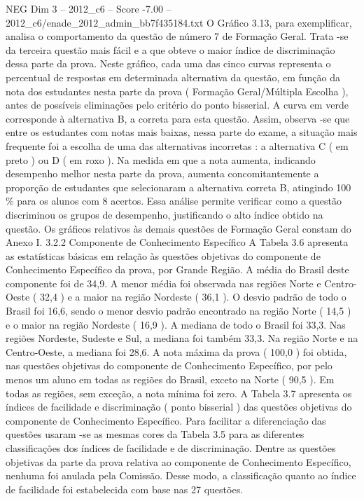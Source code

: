 \begin{textsample}{NEG Dim 3 – 2012\_c6 – Score -7.00 – 2012\_c6/enade\_2012\_admin\_bb7f435184.txt}
O Gráfico 3.13, para exemplificar, analisa o comportamento da questão de número 7 de Formação Geral.
Trata -se da terceira questão mais fácil e a que obteve o maior índice de discriminação dessa parte da prova.
Neste gráfico, cada uma das cinco curvas representa o percentual de respostas em determinada alternativa da questão, em função da nota dos estudantes nesta parte da prova ( Formação Geral/Múltipla Escolha ), antes de possíveis eliminações pelo critério do ponto bisserial.
A curva em verde corresponde à alternativa B, a correta para esta questão.
Assim, observa -se que entre os estudantes com notas mais baixas, nessa parte do exame, a situação mais frequente foi a escolha de uma das alternativas incorretas : a alternativa C ( em preto ) ou D ( em roxo ).
Na medida em que a nota aumenta, indicando desempenho melhor nesta parte da prova, aumenta concomitantemente a proporção de estudantes que selecionaram a alternativa correta B, atingindo 100 \% para os alunos com 8 acertos.
Essa análise permite verificar como a questão discriminou os grupos de desempenho, justificando o alto índice obtido na questão.
Os gráficos relativos às demais questões de Formação Geral constam do Anexo I. 3.2.2 Componente de Conhecimento Específico A Tabela 3.6 apresenta as estatísticas básicas em relação às questões objetivas do componente de Conhecimento Específico da prova, por Grande Região.
A média do Brasil deste componente foi de 34,9.
A menor média foi observada nas regiões Norte e Centro-Oeste ( 32,4 ) e a maior na região Nordeste ( 36,1 ).
O desvio padrão de todo o Brasil foi 16,6, sendo o menor desvio padrão encontrado na região Norte ( 14,5 ) e o maior na região Nordeste ( 16,9 ).
A mediana de todo o Brasil foi 33,3.
Nas regiões Nordeste, Sudeste e Sul, a mediana foi também 33,3.
Na região Norte e na Centro-Oeste, a mediana foi 28,6.
A nota máxima da prova ( 100,0 ) foi obtida, nas questões objetivas do componente de Conhecimento Específico, por pelo menos um aluno em todas as regiões do Brasil, exceto na Norte ( 90,5 ).
Em todas as regiões, sem exceção, a nota mínima foi zero.
A Tabela 3.7 apresenta os índices de facilidade e discriminação ( ponto bisserial ) das questões objetivas do componente de Conhecimento Específico.
Para facilitar a diferenciação das questões usaram -se as mesmas cores da Tabela 3.5 para as diferentes classificações dos índices de facilidade e de discriminação.
Dentre as questões objetivas da parte da prova relativa ao componente de Conhecimento Específico, nenhuma foi anulada pela Comissão.
Desse modo, a classificação quanto ao índice de facilidade foi estabelecida com base nas 27 questões.

\end{textsample}
